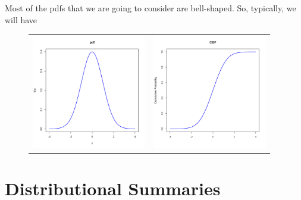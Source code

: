 \documentclass[notes=show,smaller]{beamer}\usepackage[]{graphicx}\usepackage[]{color}
\begin{document}
\begin{frame}{\secname}
  Most of the pdfs that we are going to consider are bell-shaped. So, typically, we will have
  \begin{figure}[h]
  \begin{center}
  \begin{tabular}{cc}
  \includegraphics[width=5cm, height=5.cm]{img/R_bell_pdf} & \includegraphics[width=5cm, height=5cm]{img/R_bell_CDF.pdf} \\
  \end{tabular}
  \end{center}
  \par
  \end{figure}
\end{frame}

\section{Distributional Summaries}
\end{document}
